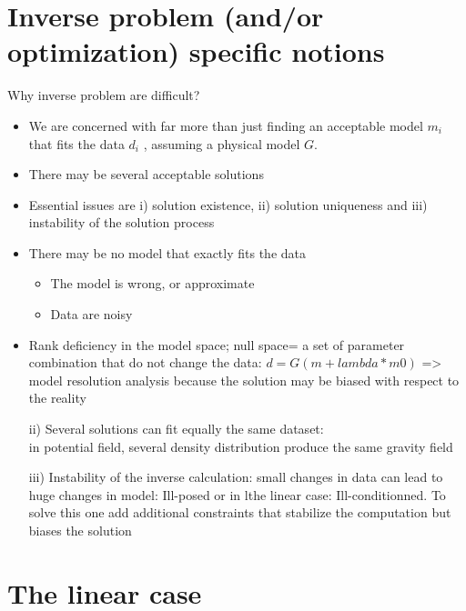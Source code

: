 \documentclass{beamer}
\begin{document}
\section{Inverse problem (and/or optimization) specific notions}

\begin{frame}
 {Why inverse problem are difficult?}

 \begin{itemize}
  \item We are concerned with far more than just finding an acceptable model {$m_i$} that fits the data {$d_i$} , assuming a physical model $G$.
  \item There may be several acceptable solutions
  \item Essential issues are i) solution existence, ii) solution uniqueness and iii) instability of the solution process
   \item There may be no model that exactly fits the data
   \begin{itemize}
    \item The model is wrong, or approximate
    \item Data are noisy
   \end{itemize}
   \item  Rank deficiency in the model space; null space= a set of parameter combination that do not change the data: $d=G(m+lambda*m0)$ => model resolution analysis because the solution may be biased with respect to the reality
 \item[ii)] Several solutions can fit equally the same dataset: \\ in potential field, several density distribution produce the same gravity field
 \item[iii)] Instability of the inverse calculation: small changes in data can lead to huge changes in model: Ill-posed or in lthe linear case: Ill-conditionned. To solve this one add additional constraints that stabilize the computation but biases the solution
 \end{itemize}




 
\end{frame}



\section{The linear case}
\end{document}
